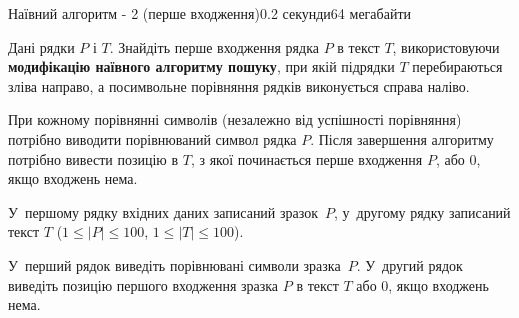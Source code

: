 \begin{problem}{Наївний алгоритм - 2 (перше входження)}{}{}{0.2 секунди}{64 мегабайти}

Дані рядки $P$ і $T$. Знайдіть перше входження рядка $P$ в текст $T$, використовуючи {\bf модифікацію наївного алгоритму пошуку}, 
при якій підрядки $T$ перебираються зліва направо, а посимвольне порівняння рядків виконується справа наліво.

При кожному порівнянні символів (незалежно від успішності порівняння) потрібно виводити порівнюваний символ рядка $P$. 
Після завершення алгоритму потрібно вивести позицію в $T$, з якої починається перше входження $P$, або $0$, якщо входжень нема. 

\InputFile
У~першому рядку вхідних даних записаний зразок~$P$, 
у~другому рядку записаний текст $T$ ($1 \le |P| \le 100$, $1 \le |T| \le 100$).


\OutputFile
У~перший рядок виведіть порівнювані символи зразка~$P$.
У~другий рядок виведіть позицію першого входження зразка $P$ в текст $T$ або $0$, якщо входжень нема.


\Examples

\begin{example}
%
\end{example}

\end{problem}


